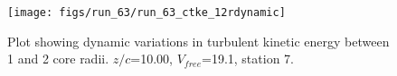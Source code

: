 \begin{figure}[H]
\centering
\texttt{[image: figs/run\_63/run\_63\_ctke\_12rdynamic]}
\caption{Plot showing dynamic variations in turbulent kinetic energy between 1 and 2 core radii. $z/c$=10.00, $V_{free}$=19.1, station 7.}
\label{fig:run_63_ctke_12rdynamic}
\end{figure}


